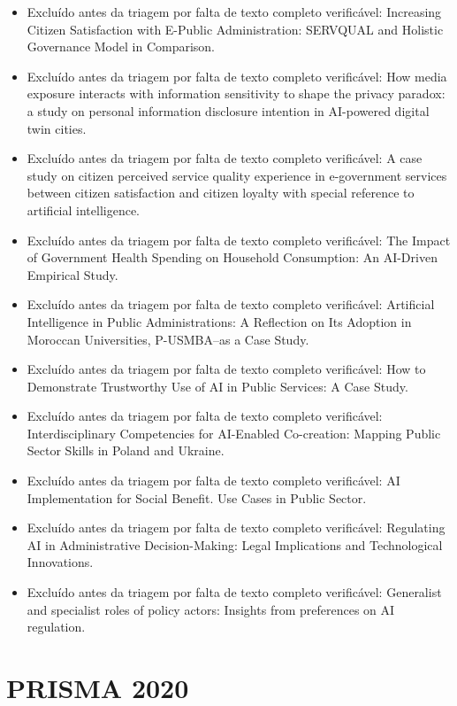 \documentclass[12pt,a4paper]{article}
\begin{document}
\begin{itemize}
\item Excluído antes da triagem por falta de texto completo verificável: Increasing Citizen Satisfaction with E-Public Administration: SERVQUAL and Holistic Governance Model in Comparison.
\item Excluído antes da triagem por falta de texto completo verificável: How media exposure interacts with information sensitivity to shape the privacy paradox: a study on personal information disclosure intention in AI-powered digital twin cities.
\item Excluído antes da triagem por falta de texto completo verificável: A case study on citizen perceived service quality experience in e-government services between citizen satisfaction and citizen loyalty with special reference to artificial intelligence.
\item Excluído antes da triagem por falta de texto completo verificável: The Impact of Government Health Spending on Household Consumption: An AI-Driven Empirical Study.
\item Excluído antes da triagem por falta de texto completo verificável: Artificial Intelligence in Public Administrations: A Reflection on Its Adoption in Moroccan Universities, P-USMBA–as a Case Study.
\item Excluído antes da triagem por falta de texto completo verificável: How to Demonstrate Trustworthy Use of AI in Public Services: A Case Study.
\item Excluído antes da triagem por falta de texto completo verificável: Interdisciplinary Competencies for AI-Enabled Co-creation: Mapping Public Sector Skills in Poland and Ukraine.
\item Excluído antes da triagem por falta de texto completo verificável: AI Implementation for Social Benefit. Use Cases in Public Sector.
\item Excluído antes da triagem por falta de texto completo verificável: Regulating AI in Administrative Decision-Making: Legal Implications and Technological Innovations.
\item Excluído antes da triagem por falta de texto completo verificável: Generalist and specialist roles of policy actors: Insights from preferences on AI regulation.
\end{itemize}

\section{PRISMA 2020}
\label{sec:org150cd46}
\end{document}
